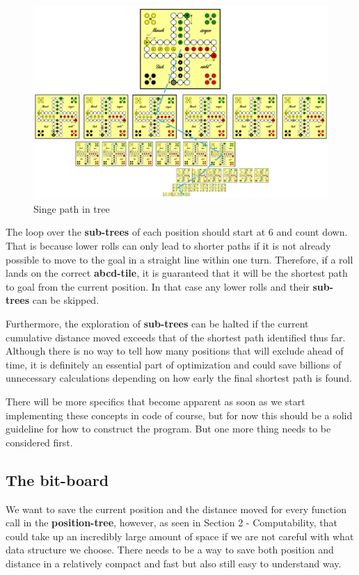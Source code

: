 \documentclass[12pt]{article}
\begin{document}
\begin{figure}[htbp]
    \centering
    \includegraphics[width=1\textwidth]{images/Figure5}
    \caption{Singe path in tree}
    \label{fig:pathintree}
\end{figure}

The loop over the \textbf{sub-trees} of each position should start at 6 and count down. That is because lower rolls can only lead to shorter paths if it is not already possible to move to the goal in a straight line within one turn. Therefore, if a roll lands on the correct \textbf{abcd-tile}, it is guaranteed that it will be the shortest path to goal from the current position. In that case any lower rolls and their \textbf{sub-trees} can be skipped.

Furthermore, the exploration of \textbf{sub-trees} can be halted if the current cumulative distance moved exceeds that of the shortest path identified thus far. Although there is no way to tell how many positions that will exclude ahead of time, it is definitely an essential part of optimization and could save billions of unnecessary calculations depending on how early the final shortest path is found.

There will be more specifics that become apparent as soon as we start implementing these concepts in code of course, but for now this should be a solid guideline for how to construct the program. But one more thing needs to be considered first.

\subsection{The bit-board}
We want to save the current position and the distance moved for every function call in the \textbf{position-tree}, however, as seen in Section 2 - Computability, that could take up an incredibly large amount of space if we are not careful with what data structure we choose.
There needs to be a way to save both position and distance in a relatively compact and fast but also still easy to understand way.
\end{document}
